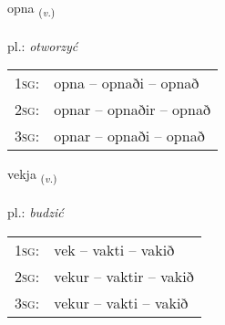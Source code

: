 \documentclass[frontgrid, backgrid]{flacards}\usepackage[]{graphicx}\usepackage[]{xcolor}
\begin{document}
\renewcommand{\flhead}{\vskip5pt \fboxsep=0pt {\small\bfseries\footnotesize Sagnorð | czasownik}}
\renewcommand{\fcfoot}{\vskip5pt \fboxsep=0pt \hspace{2pt}{\small\bfseries\footnotesize 1K}}

\renewcommand{\blhead}{\vskip5pt {\small\bfseries\footnotesize Sagnorð | czasownik }}
\renewcommand{\bcfoot}{\vskip5pt \hspace{2pt}{\small\bfseries\footnotesize 1K}}


{opna \small{\textsubscript{(\textit{v.})}} \\[1ex] %
\textphonetic{[ɔhpna]} \\
pl.: \emph{otworzyć} \\  [2ex]
\renewcommand*{\arraystretch}{0.8}
\begin{tabular}{p{1cm}l}
\textsc{1sg}: & opna -- opnaði -- opnað \\ 
\textsc{2sg}: & opnar -- opnaðir -- opnað \\ 
\textsc{3sg}: & opnar -- opnaði -- opnað \\ 
\end{tabular}
}

\renewcommand{\flhead}{\vskip5pt \fboxsep=0pt {\small\bfseries\footnotesize Sagnorð | czasownik}}
\renewcommand{\fcfoot}{\vskip5pt \fboxsep=0pt \hspace{2pt}{\small\bfseries\footnotesize 1K}}

\renewcommand{\blhead}{\vskip5pt {\small\bfseries\footnotesize Sagnorð | czasownik }}
\renewcommand{\bcfoot}{\vskip5pt \hspace{2pt}{\small\bfseries\footnotesize 1K}}


{vekja \small{\textsubscript{(\textit{v.})}} \\[1ex] %
\textphonetic{[vɛːca]} \\
pl.: \emph{budzić} \\  [2ex]
\renewcommand*{\arraystretch}{0.8}
\begin{tabular}{p{1cm}l}
\textsc{1sg}: & vek -- vakti -- vakið \\ 
\textsc{2sg}: & vekur -- vaktir -- vakið \\ 
\textsc{3sg}: & vekur -- vakti -- vakið \\ 
\end{tabular}
}
\end{document}
